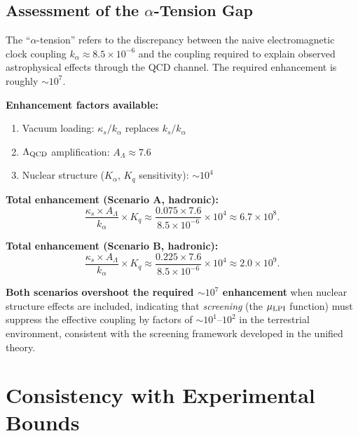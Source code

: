 \documentclass[11pt,letterpaper]{article}
\newcommand{\kalpha}{k_\alpha}
\theoremstyle{definition}
\begin{document}
\subsection{Assessment of the $\alpha$-Tension Gap}

The ``$\alpha$-tension'' refers to the discrepancy between the naive
electromagnetic clock coupling $\kalpha \approx 8.5 \times 10^{-6}$
and the coupling required to explain observed astrophysical effects
through the QCD channel.  The required enhancement is roughly
$\sim 10^7$.

\begin{tcolorbox}[colback=green!5!white, colframe=green!50!black,
title=Gap Analysis]
\textbf{Enhancement factors available:}
\begin{enumerate}
\item Vacuum loading: $\kappa_s/\kalpha$ replaces $k_s/\kalpha$
\item $\Lambda_{\rm QCD}$ amplification: $A_\Lambda \approx 7.6$
\item Nuclear structure ($K_\alpha$, $K_q$ sensitivity): $\sim 10^4$
\end{enumerate}

\textbf{Total enhancement (Scenario A, hadronic):}
\begin{equation}
\frac{\kappa_s \times A_\Lambda}{\kalpha} \times K_q
\approx \frac{0.075 \times 7.6}{8.5 \times 10^{-6}} \times 10^4
\approx 6.7 \times 10^8.
\end{equation}

\textbf{Total enhancement (Scenario B, hadronic):}
\begin{equation}
\frac{\kappa_s \times A_\Lambda}{\kalpha} \times K_q
\approx \frac{0.225 \times 7.6}{8.5 \times 10^{-6}} \times 10^4
\approx 2.0 \times 10^9.
\end{equation}

\textbf{Both scenarios overshoot the required $\sim 10^7$ enhancement}
when nuclear structure effects are included, indicating that
\emph{screening} (the $\mu_{\rm LPI}$ function) must suppress the
effective coupling by factors of $\sim 10^{1}$--$10^2$ in the
terrestrial environment, consistent with the screening framework
developed in the unified theory.
\end{tcolorbox}

\section{Consistency with Experimental Bounds}\label{sec:bounds}
\end{document}
